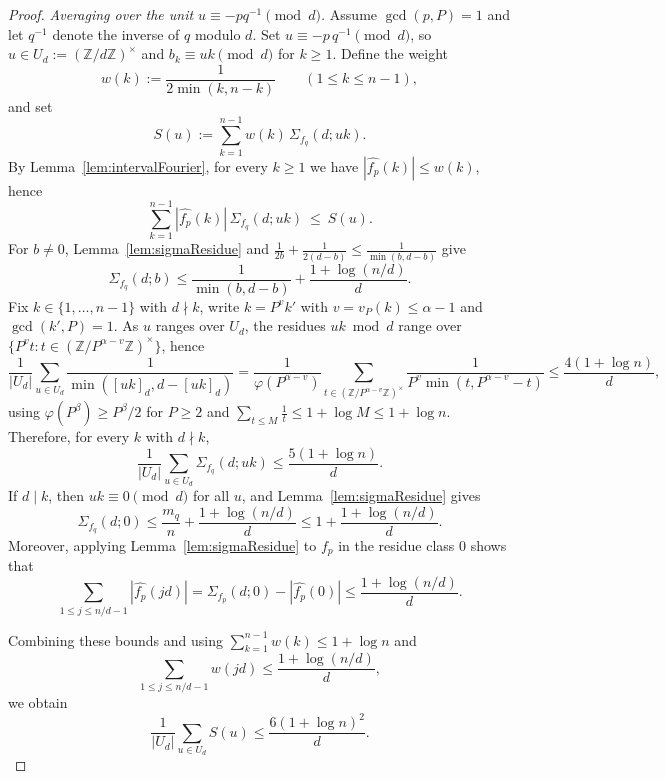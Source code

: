 \documentclass[12pt]{amsart}
\begin{document}
\begin{proof}
\smallskip
\noindent\emph{Averaging over the unit $u\equiv -p q^{-1}\pmod d$.}
Assume $\gcd(p,P)=1$ and let $q^{-1}$ denote the inverse of $q$ modulo $d$.
Set $u\equiv -p\,q^{-1}\pmod d$, so $u\in U_d:=(\mathbb Z/d\mathbb Z)^\times$ and $b_k\equiv uk\pmod d$ for $k\ge 1$. Define the weight
\[
w(k):=\frac{1}{2\min(k,n-k)} \qquad (1\le k\le n-1),
\]
and set
\[
S(u):=\sum_{k=1}^{n-1} w(k)\,\Sigma_{f_q}(d;uk).
\]
By Lemma~\ref{lem:intervalFourier}, for every $k\ge 1$ we have $|\widehat{f_p}(k)|\le w(k)$, hence
\[
\sum_{k=1}^{n-1}|\widehat{f_p}(k)|\,\Sigma_{f_q}(d;uk)\ \le\ S(u).
\]
For $b\neq 0$, Lemma~\ref{lem:sigmaResidue} and $\frac{1}{2b}+\frac{1}{2(d-b)}\le \frac{1}{\min(b,d-b)}$ give
\[
\Sigma_{f_q}(d;b)\le \frac{1}{\min(b,d-b)}+\frac{1+\log(n/d)}{d}.
\]
Fix $k\in\{1,\dots,n-1\}$ with $d\nmid k$, write $k=P^{v}k'$ with $v=v_P(k)\le \alpha-1$ and $\gcd(k',P)=1$.
As $u$ ranges over $U_d$, the residues $uk\bmod d$ range over
$\{P^{v}t: t\in (\mathbb Z/P^{\alpha-v}\mathbb Z)^\times\}$, hence
\[
\frac{1}{|U_d|}\sum_{u\in U_d}\frac{1}{\min([uk]_d,d-[uk]_d)}
=\frac{1}{\varphi(P^{\alpha-v})}\sum_{t\in (\mathbb Z/P^{\alpha-v}\mathbb Z)^\times}
\frac{1}{P^{v}\min(t,P^{\alpha-v}-t)}
\le \frac{4(1+\log n)}{d},
\]
using $\varphi(P^{\beta})\ge P^{\beta}/2$ for $P\ge 2$ and $\sum_{t\le M}\frac{1}{t}\le 1+\log M\le 1+\log n$.
Therefore, for every $k$ with $d\nmid k$,
\[
\frac{1}{|U_d|}\sum_{u\in U_d}\Sigma_{f_q}(d;uk)\le \frac{5(1+\log n)}{d}.
\]
If $d\mid k$, then $uk\equiv 0 \pmod d$ for all $u$, and Lemma~\ref{lem:sigmaResidue} gives
\[
\Sigma_{f_q}(d;0)\le \frac{m_q}{n}+\frac{1+\log(n/d)}{d}\le 1+\frac{1+\log(n/d)}{d}.
\]
Moreover, applying Lemma~\ref{lem:sigmaResidue} to $f_p$ in the residue class $0$ shows that
\begin{equation}\label{eq:multdTail_p}
\sum_{1\le j\le n/d-1}|\widehat{f_p}(jd)|
=\Sigma_{f_p}(d;0)-|\widehat{f_p}(0)|
\le \frac{1+\log(n/d)}{d}.
\end{equation}

Combining these bounds and using $\sum_{k=1}^{n-1} w(k)\le 1+\log n$ and
$$\sum_{1\le j\le n/d-1} w(jd)\le \frac{1+\log(n/d)}{d},
$$
we obtain
\begin{equation}\label{eq:avgS}
\frac{1}{|U_d|}\sum_{u\in U_d} S(u)\le \frac{6(1+\log n)^2}{d}.
\end{equation}


\end{proof}
\end{document}
